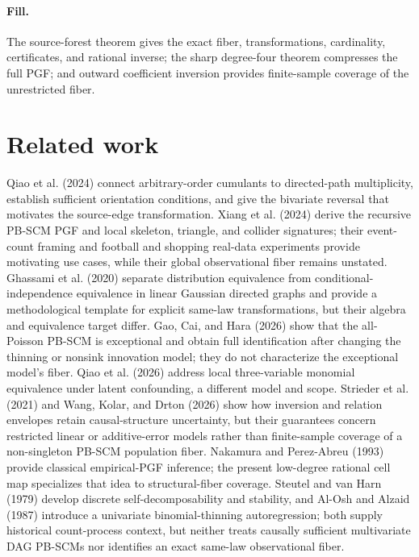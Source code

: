 \documentclass{article}
\begin{document}
\paragraph{Fill.} The source-forest theorem gives the exact fiber, transformations, cardinality, certificates, and rational inverse; the sharp degree-four theorem compresses the full PGF; and outward coefficient inversion provides finite-sample coverage of the unrestricted fiber.

\section{Related work}

Qiao et al. (2024) connect arbitrary-order cumulants to directed-path multiplicity, establish sufficient orientation conditions, and give the bivariate reversal that motivates the source-edge transformation. Xiang et al. (2024) derive the recursive PB-SCM PGF and local skeleton, triangle, and collider signatures; their event-count framing and football and shopping real-data experiments provide motivating use cases, while their global observational fiber remains unstated. Ghassami et al. (2020) separate distribution equivalence from conditional-independence equivalence in linear Gaussian directed graphs and provide a methodological template for explicit same-law transformations, but their algebra and equivalence target differ. Gao, Cai, and Hara (2026) show that the all-Poisson PB-SCM is exceptional and obtain full identification after changing the thinning or nonsink innovation model; they do not characterize the exceptional model's fiber. Qiao et al. (2026) address local three-variable monomial equivalence under latent confounding, a different model and scope. Strieder et al. (2021) and Wang, Kolar, and Drton (2026) show how inversion and relation envelopes retain causal-structure uncertainty, but their guarantees concern restricted linear or additive-error models rather than finite-sample coverage of a non-singleton PB-SCM population fiber. Nakamura and Perez-Abreu (1993) provide classical empirical-PGF inference; the present low-degree rational cell map specializes that idea to structural-fiber coverage. Steutel and van Harn (1979) develop discrete self-decomposability and stability, and Al-Osh and Alzaid (1987) introduce a univariate binomial-thinning autoregression; both supply historical count-process context, but neither treats causally sufficient multivariate DAG PB-SCMs nor identifies an exact same-law observational fiber.
\end{document}
